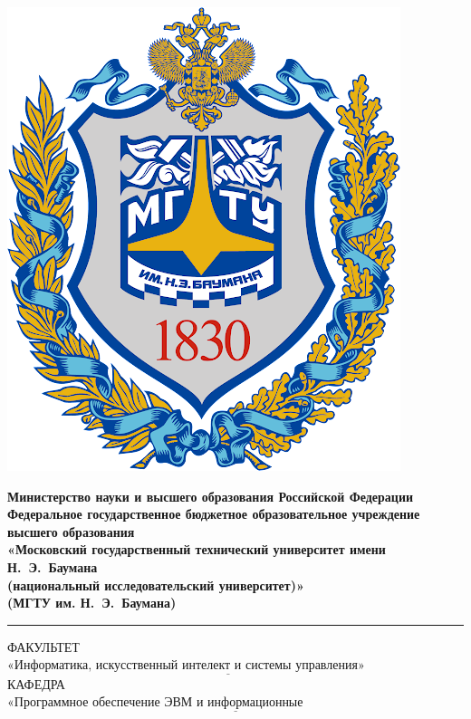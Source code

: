 \begin{titlepage}
	\fontsize{12pt}{12pt}\selectfont
	\noindent \begin{minipage}{0.15\textwidth}
		\includegraphics[width=\linewidth]{img/b_logo.png}
	\end{minipage}
	\noindent\begin{minipage}{0.9\textwidth}\centering
		\textbf{Министерство науки и высшего образования Российской Федерации}\\
		\textbf{Федеральное государственное бюджетное образовательное учреждение высшего образования}\\
		\textbf{«Московский государственный технический университет имени Н.~Э.~Баумана}\\
		\textbf{(национальный исследовательский университет)»}\\
		\textbf{(МГТУ им. Н.~Э.~Баумана)}
	\end{minipage}

	\noindent\rule{18cm}{3pt}
	\newline\newline
	\noindent ФАКУЛЬТЕТ $\underline{\text{«Информатика, искусственный интелект и системы управления»~~~~~~~~~~~~~~~~~~~~}}$ \newline\newline
	\noindent КАФЕДРА $\underline{\text{«Программное обеспечение ЭВМ и информационные технологии»~~~~~~~~~~~~~~~~~~~~~~~}}$\newline\newline\newline\newline\newline\newline\newline



\end{titlepage}
